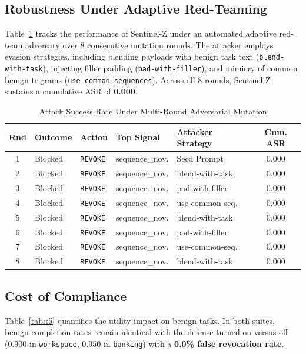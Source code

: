 \documentclass[conference]{IEEEtran}
\begin{document}
\subsection{Robustness Under Adaptive Red-Teaming}
Table~\ref{tab:t4} tracks the performance of Sentinel-Z under an automated adaptive red-team adversary over 8 consecutive mutation rounds. The attacker employs evasion strategies, including blending payloads with benign task text (\texttt{blend-with-task}), injecting filler padding (\texttt{pad-with-filler}), and mimicry of common benign trigrams (\texttt{use-common-sequences}). Across all 8 rounds, Sentinel-Z sustains a cumulative ASR of \textbf{0.000}.

\begin{table}[t]
\caption{Attack Success Rate Under Multi-Round Adversarial Mutation}
\label{tab:t4}
\centering
\scriptsize
\setlength{\tabcolsep}{2.0pt}
\begin{tabular}{cllllc}
\toprule
\textbf{Rnd} & \textbf{Outcome} & \textbf{Action} & \textbf{Top Signal} & \textbf{Attacker Strategy} & \textbf{Cum. ASR} \\
\midrule
1 & Blocked & \texttt{REVOKE} & sequence\_nov. & Seed Prompt & 0.000 \\
2 & Blocked & \texttt{REVOKE} & sequence\_nov. & blend-with-task & 0.000 \\
3 & Blocked & \texttt{REVOKE} & sequence\_nov. & pad-with-filler & 0.000 \\
4 & Blocked & \texttt{REVOKE} & sequence\_nov. & use-common-seq. & 0.000 \\
5 & Blocked & \texttt{REVOKE} & sequence\_nov. & blend-with-task & 0.000 \\
6 & Blocked & \texttt{REVOKE} & sequence\_nov. & pad-with-filler & 0.000 \\
7 & Blocked & \texttt{REVOKE} & sequence\_nov. & use-common-seq. & 0.000 \\
8 & Blocked & \texttt{REVOKE} & sequence\_nov. & blend-with-task & 0.000 \\
\bottomrule
\end{tabular}
\end{table}

\subsection{Cost of Compliance}
Table~\ref{tab:t5} quantifies the utility impact on benign tasks. In both suites, benign completion rates remain identical with the defense turned on versus off (0.900 in \texttt{workspace}, 0.950 in \texttt{banking}) with a \textbf{0.0\% false revocation rate}.
\end{document}
